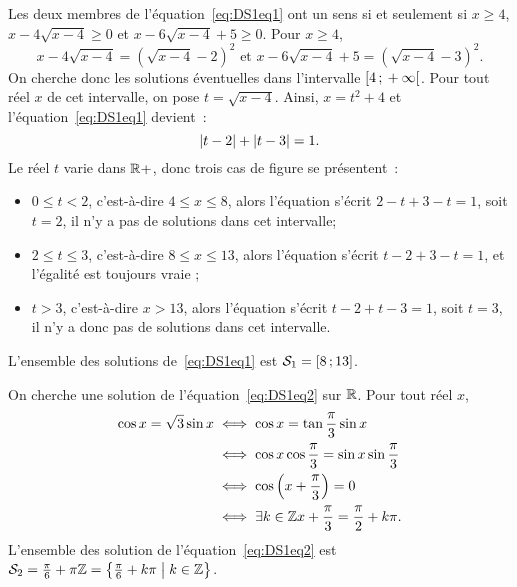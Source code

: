 \begin{corrige}
  Les deux membres de l'équation~\eqref{eq:DS1eq1} ont un sens si et seulement 
  si \(x \geq 4\), \(x-4\sqrt{x-4} \geq 0\) et \(x-6\sqrt{x-4}+5\geq 0\). Pour 
  \(x \geq 4\),
  \[x - 4\sqrt{x-4} = (\sqrt{x-4}-2)^2 \text{~et~} x-6\sqrt{x-4}+5 = 
  (\sqrt{x-4}-3)^2.\]
  On cherche donc les solutions éventuelles dans l'intervalle 
  \(\left[ 4 \, ; {} +\infty \right[\). Pour tout réel \(x\) de cet intervalle, on pose 
  \(t = \sqrt{x-4}\). Ainsi, \(x = t^2+4\) et l'équation~\eqref{eq:DS1eq1} 
  devient~:
  \[\left\lvert t-2\right\rvert + \left\lvert t-3\right\rvert = 1.\] Le réel \(t\) varie dans \(\mathbb{R}+\), donc trois 
  cas de figure se présentent~:
  \begin{itemize}
    \item \(0 \leq t < 2\), c'est-à-dire \(4\leq x \leq 8\),  alors l'équation 
      s'écrit \(2-t+3-t=1\), soit \(t=2\), il n'y a pas de solutions dans cet 
      intervalle;
    \item \(2 \leq t \leq 3\), c'est-à-dire \(8\leq x \leq 13\), alors 
      l'équation s'écrit \(t-2+3-t=1\), et l'égalité est toujours vraie ;
    \item \(t > 3\), c'est-à-dire \(x > 13\), alors l'équation s'écrit 
      \(t-2+t-3=1\), soit \(t=3\), il n'y a donc pas de solutions dans cet 
      intervalle.
  \end{itemize}
  L'ensemble des solutions de~\eqref{eq:DS1eq1} est \(\mathcal{S}_1 = 
  \left[ 8 \, ; {} 13 \right]\).

  On cherche une solution de l'équation~\eqref{eq:DS1eq2} sur \(\mathbb{R}\). Pour tout 
  réel \(x\),
  \begin{align*}
    \cos x = \sqrt{3}\sin x &\iff \cos x = \tan\frac{\pi}{3} \sin x \\
    &\iff \cos x \cos \frac{\pi}{3} = \sin x \sin\frac{\pi}{3} \\
    &\iff \cos\left(x+\frac{\pi}{3}\right) = 0 \\
    &\iff \exists k \in \mathbb{Z} x +\frac{\pi}{3} = \frac{\pi}{2}+k\pi.
  \end{align*}
  L'ensemble des solution de l'équation~\eqref{eq:DS1eq2} est \(\mathcal{S}_2 = 
  \frac{\pi}{6}+\pi\mathbb{Z} = \left\{\frac{\pi}{6}+k\pi\mathrel{}\middle|\mathrel{}k \in \mathbb{Z}\right\}\).


\end{corrige}
